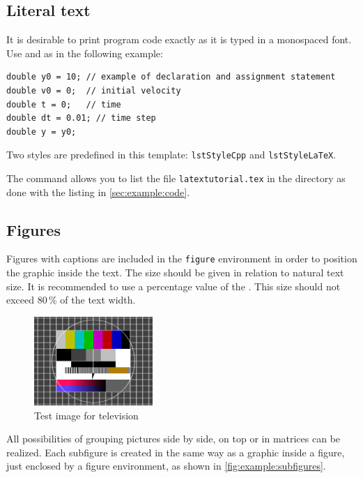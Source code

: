 \subsection{Literal text}
\label{sec:example:verbatim}

It is desirable to print program code exactly as it is typed in a
monospaced font. Use  and
 as in the following example:
\begin{lstlisting}[style=lstStyleCpp]
double y0 = 10; // example of declaration and assignment statement
double v0 = 0;  // initial velocity
double t = 0;   // time
double dt = 0.01; // time step
double y = y0;
\end{lstlisting}
Two styles are predefined in this template: \texttt{lstStyleCpp} and \texttt{lstStyleLaTeX}.

The command 
allows you to list the file \texttt{latextutorial.tex} in the directory  as done with the listing in \cref{sec:example:code}.
\subsection{Figures}
\label{sec:example:figures}

Figures with captions are included in the \texttt{figure} environment in order to position the graphic inside the text. The size should be given in relation to natural text size. It is recommended to use a percentage value of the . This size should not exceed 80\,\%  of the text width.

\begin{figure}[htb]
  \centering
  \includegraphics[width=0.4\textwidth]{images/testimage.png}
  \caption{Test image for television}
  \label{fig:example:figure}
\end{figure}

All possibilities of grouping pictures side by side, on top or in matrices can be realized. Each subfigure is created in the same way as a graphic inside a figure, just enclosed by a figure environment, as shown in \cref{fig:example:subfigures}.

